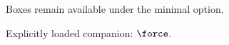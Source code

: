 \documentclass[minimal]{otscience}
\begin{document}

\begin{definitionbox}Boxes remain available under the minimal option.\end{definitionbox}

Explicitly loaded companion: $\force$.
\end{document}
